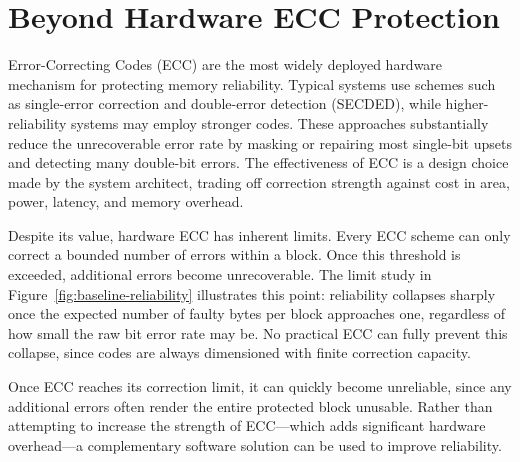 \section{Beyond Hardware ECC Protection}
\label{sec:beyond-ecc}

Error-Correcting Codes (ECC) are the most widely deployed hardware mechanism for 
protecting memory reliability. Typical systems use schemes such as single-error 
correction and double-error detection (SECDED), while higher-reliability systems 
may employ stronger codes. These approaches substantially reduce the unrecoverable 
error rate by masking or repairing most single-bit upsets and detecting many 
double-bit errors. The effectiveness of ECC is a design choice made by the system 
architect, trading off correction strength against cost in area, power, latency, 
and memory overhead.  

Despite its value, hardware ECC has inherent limits. Every ECC scheme can only correct 
a bounded number of errors within a block. Once this threshold is exceeded, additional 
errors become unrecoverable. The limit study in Figure~\ref{fig:baseline-reliability} 
illustrates this point: reliability collapses sharply once the expected number of 
faulty bytes per block approaches one, regardless of how small the raw bit error rate 
may be. No practical ECC can fully prevent this collapse, since codes are always 
dimensioned with finite correction capacity.  

Once ECC reaches its correction limit, it can quickly become unreliable, since any 
additional errors often render the entire protected block unusable. Rather than attempting 
to increase the strength of ECC---which adds significant hardware overhead---a 
complementary software solution can be used to improve reliability.  
